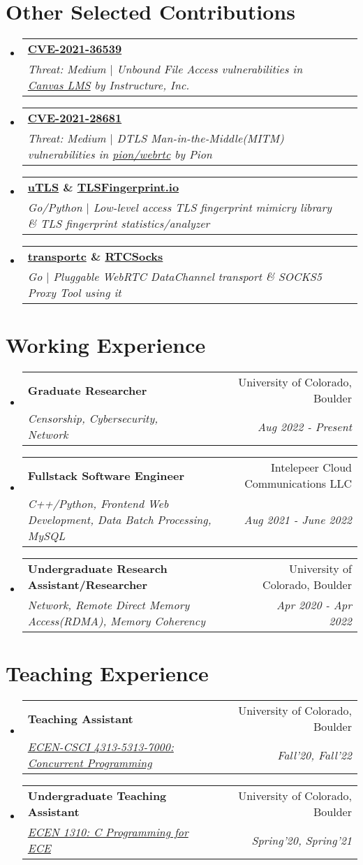 \documentclass[letterpaper,11pt]{article}
\makeatletter
\newcommand{\resumeSubheading}[4]{
  \vspace{-2pt}\item
    \begin{tabular*}{0.97\textwidth}[t]{l@{\extracolsep{\fill}}r}
      \textbf{#1} & #2 \\
      \textit{\small#3} & \textit{\small #4} \\
    \end{tabular*}\vspace{-7pt}
}
\newcommand{\resumeSubHeadingListStart}{\begin{itemize}[leftmargin=0.15in, label={}]}
\newcommand{\resumeSubHeadingListEnd}{\end{itemize}}
\makeatother
\begin{document}
\section{Other Selected Contributions}
\resumeSubHeadingListStart
\resumeSubheading
{\href{https://cve.mitre.org/cgi-bin/cvename.cgi?name=CVE-2021-36539}{\textbf{CVE-2021-36539}}}{}
{Threat: Medium $|$ Unbound File Access vulnerabilities in \href{https://www.instructure.com/canvas}{Canvas LMS} by \emph{Instructure, Inc.}}{}
\resumeSubheading
{\href{https://cve.mitre.org/cgi-bin/cvename.cgi?name=CVE-2021-28681}{\textbf{CVE-2021-28681}}}{}
{Threat: Medium $|$ DTLS Man-in-the-Middle(MITM) vulnerabilities in \href{https://github.com/pion/webrtc}{pion/webrtc} by \emph{Pion}}{}
\resumeSubheading
{\href{https://github.com/refraction-networking/utls}{\textbf{uTLS}} \& \href{https://github.com/refraction-networking/tls-fingerprint}{\textbf{TLSFingerprint.io}}}{}
{Go/Python $|$ Low-level access TLS fingerprint mimicry library \& TLS fingerprint statistics/analyzer}{}
\resumeSubheading
{\href{https://github.com/gaukas/transportc}{\textbf{transportc}} \& \href{https://github.com/gaukas/rtcsocks}{\textbf{RTCSocks}}}{}
{Go $|$ Pluggable WebRTC DataChannel transport \& SOCKS5 Proxy Tool using it}{}
\resumeSubHeadingListEnd
\vspace{1pt}

\section{Working Experience}
\resumeSubHeadingListStart
\resumeSubheading
{Graduate Researcher}{University of Colorado, Boulder}
{Censorship, Cybersecurity, Network}{Aug 2022 - Present}
\resumeSubheading
{Fullstack Software Engineer}{Intelepeer Cloud Communications LLC}
{C++/Python, Frontend Web Development, Data Batch Processing, MySQL}{Aug 2021 - June 2022}
\resumeSubheading
{Undergraduate Research Assistant/Researcher}{University of Colorado, Boulder}
{Network, Remote Direct Memory Access(RDMA), Memory Coherency}{Apr 2020 - Apr 2022}
\resumeSubHeadingListEnd
\vspace{1pt}

\section{Teaching Experience}
\resumeSubHeadingListStart
\resumeSubheading
{Teaching Assistant}{University of Colorado, Boulder}
{\href{https://experts.colorado.edu/display/coursename_ECEN-4313}{ECEN-CSCI 4313-5313-7000: Concurrent Programming}}{Fall'20, Fall'22}
\resumeSubheading
{Undergraduate Teaching Assistant}{University of Colorado, Boulder}
{\href{https://experts.colorado.edu/display/coursename_ECEN-1310}{ECEN 1310: C Programming for ECE}}{Spring'20, Spring'21}
\resumeSubHeadingListEnd
\vspace{1pt}
\end{document}
